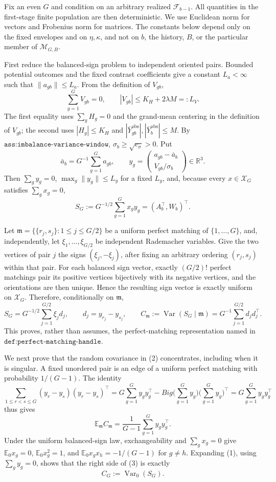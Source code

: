 Fix an even \(G\) and condition on an arbitrary realized \(\mathcal F_{b-1}\).  All quantities in the first-stage finite population are then deterministic.  We use Euclidean norm for vectors and Frobenius norm for matrices.  The constants below depend only on the fixed envelopes and on \(\eta,\kappa\), and not on \(b\), the history, \(B\), or the particular member of \(\mathcal M_{G,B}\).

First reduce the balanced-sign problem to independent oriented pairs.  Bounded potential outcomes and the fixed contrast coefficients give a constant \(L_a<\infty\) such that \(\|a_{gb}\|\leq L_a\).  From the definition of \(V_{gb}\),
\[
 \sum_{g=1}^G V_{gb}=0,
 \qquad
 |V_{gb}|\leq K_H+2\lambda M=:L_V.
\]
The first equality uses \(\sum_gH_g=0\) and the grand-mean centering in the definition of \(V_{gb}\); the second uses \(|H_g|\leq K_H\) and \(|\bar Y^{\mathrm{obs}}_{gb}|,|\bar Y^{\mathrm{obs}}_b|\leq M\).  By \(\texttt{ass:imbalance-variance-window}\), \(\sigma_b\geq\sqrt{c_\sigma}>0\).  Put
\[
 \bar a_b=G^{-1}\sum_{g=1}^Ga_{gb},
 \qquad
 y_g=\begin{pmatrix}a_{gb}-\bar a_b\\ V_{gb}/\sigma_b\end{pmatrix}\in\mathbb R^3.
\]
Then \(\sum_gy_g=0\), \(\max_g\|y_g\|\leq L_y\) for a fixed \(L_y\), and, because every \(x\in\mathcal X_G\) satisfies \(\sum_gx_g=0\),
\[
 S_G:=G^{-1/2}\sum_{g=1}^Gx_gy_g=(A_b^\top,W_b)^\top. \tag{1}
\]

Let \(\mathfrak m=\{\{r_j,s_j\}:1\leq j\leq G/2\}\) be a uniform perfect matching of \(\{1,\ldots,G\}\), and, independently, let \(\xi_1,\ldots,\xi_{G/2}\) be independent Rademacher variables.  Give the two vertices of pair \(j\) the signs \((\xi_j,-\xi_j)\), after fixing an arbitrary ordering \((r_j,s_j)\) within that pair.  For each balanced sign vector, exactly \((G/2)!\) perfect matchings pair its positive vertices bijectively with its negative vertices, and the orientations are then unique.  Hence the resulting sign vector is exactly uniform on \(\mathcal X_G\).  Therefore, conditionally on \(\mathfrak m\),
\[
 S_G=G^{-1/2}\sum_{j=1}^{G/2}\xi_jd_j,
 \qquad d_j=y_{r_j}-y_{s_j},
 \qquad C_{\mathfrak m}:=\operatorname{Var}(S_G\mid\mathfrak m)
       =G^{-1}\sum_{j=1}^{G/2}d_jd_j^\top.                 \tag{2}
\]
This proves, rather than assumes, the perfect-matching representation named in \(\texttt{def:perfect-matching-handle}\).

We next prove that the random covariance in (2) concentrates, including when it is singular.  A fixed unordered pair is an edge of a uniform perfect matching with probability \(1/(G-1)\).  The identity
\[
 \sum_{1\leq r<s\leq G}(y_r-y_s)(y_r-y_s)^\top
 =G\sum_{g=1}^Gy_gy_g^\top-Big(\sum_{g=1}^Gy_g\Big)
       \Big(\sum_{g=1}^Gy_g\Big)^\top
 =G\sum_{g=1}^Gy_gy_g^\top
\]
thus gives
\[
 \mathbb E_{\mathfrak m}C_{\mathfrak m}
 =\frac1{G-1}\sum_{g=1}^Gy_gy_g^\top.                     \tag{3}
\]
Under the uniform balanced-sign law, exchangeability and \(\sum_gx_g=0\) give \(\mathbb E_0x_g=0\), \(\mathbb E_0x_g^2=1\), and \(\mathbb E_0x_gx_h=-1/(G-1)\) for \(g\ne h\).  Expanding (1), using \(\sum_gy_g=0\), shows that the right side of (3) is exactly
\[
 C_G:=\operatorname{Var}_0(S_G).                            \tag{4}
\]

